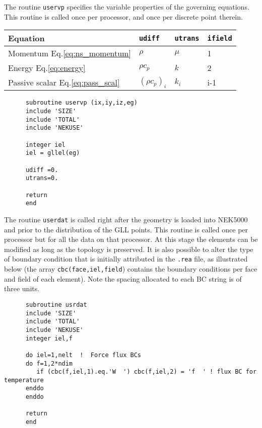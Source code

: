 The routine {\tt uservp} specifies the variable properties of the governing equations.
This routine is called once per processor, and once per discrete point therein. 
\\

\begin{tabular}{ l|l|l|l }
   \hline
   Equation & {\tt udiff} & {\tt utrans} & {\tt ifield} \\ \hline \hline
   Momentum Eq.\ref{eq:ns_momentum} & \(\rho\) & \(\mu\) & 1 \\ 
   Energy Eq.\ref{eq:energy} & \(\rho c_p\) & \(k\) & 2\\ 
   Passive scalar Eq.\ref{eq:pass_scal} &\((\rho c_p)_i\) & \(k_i\)& i-1\\
   \hline
\end{tabular}


\begin{lstlisting}
      subroutine uservp (ix,iy,iz,eg)
      include 'SIZE'
      include 'TOTAL'
      include 'NEKUSE'
      
      integer iel
      iel = gllel(eg)

      udiff =0.
      utrans=0.
      
      return
      end
\end{lstlisting}

The routine {\tt userdat} is called right after the geometry is loaded into NEK5000 and prior to the distribution of the GLL points. This routine is called once per processor but for all the data on that processor. At this stage the elements can be modified as long as the topology is preserved. It is also possible to alter the type of boundary condition that is initially attributed in the {\tt .rea} file, as illustrated below (the array {\tt cbc(face,iel,field}) contains the boundary conditions per face and field of each element). Note the spacing allocated to each BC string is of three units.

\begin{lstlisting}
      subroutine usrdat
      include 'SIZE'
      include 'TOTAL'
      include 'NEKUSE'
      integer iel,f

      do iel=1,nelt  !  Force flux BCs
      do f=1,2*ndim
         if (cbc(f,iel,1).eq.'W  ') cbc(f,iel,2) = 'f  ' ! flux BC for temperature
      enddo
      enddo
   
      return
      end
\end{lstlisting}

